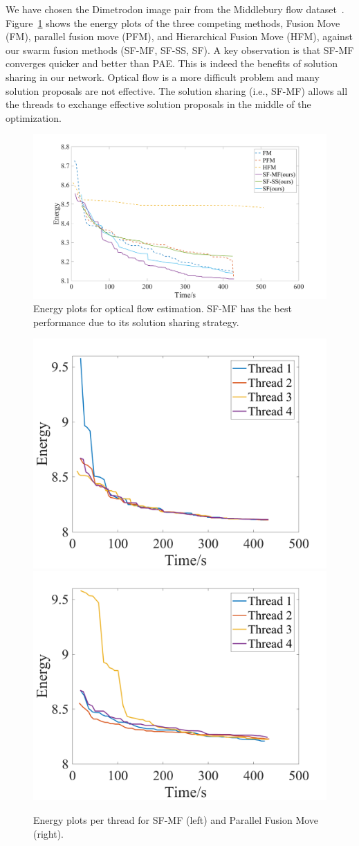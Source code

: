 
\noindent
%
We have chosen the Dimetrodon image pair from the Middlebury flow
dataset~\cite{middlebury_optical_flow}. Figure~\ref{fig:optical_flow_convergence}
shows the energy plots of the three competing methods, Fusion Move
(FM), parallel fusion move (PFM), and Hierarchical Fusion Move (HFM),
against our swarm fusion methods (SF-MF, SF-SS, SF). A key observation
is that SF-MF converges quicker and better than PAE. This is indeed the
benefits of solution sharing in our network. Optical flow is a more
difficult problem and many solution proposals are not effective.
The solution sharing (i.e., SF-MF) allows all the threads to exchange
effective solution proposals in the middle of the
optimization.
\begin{figure}[tb]
  \includegraphics[width=\columnwidth]{figure/optical_flow_convergence.png}
  \caption{Energy plots for optical flow estimation. SF-MF has the best
 performance due to its solution sharing strategy.}\label{fig:optical_flow_convergence}
\end{figure}
\begin{figure}[tb]
  \includegraphics[width=0.5\columnwidth]{figure/optical_flow_SF_MF_threads.png}
  \includegraphics[width=0.5\columnwidth]{figure/optical_flow_PFM_threads.png}
 \caption{Energy plots per thread for SF-MF (left) and Parallel Fusion
 Move (right).}\label{fig:optical_flow_by_threads}
\end{figure}
